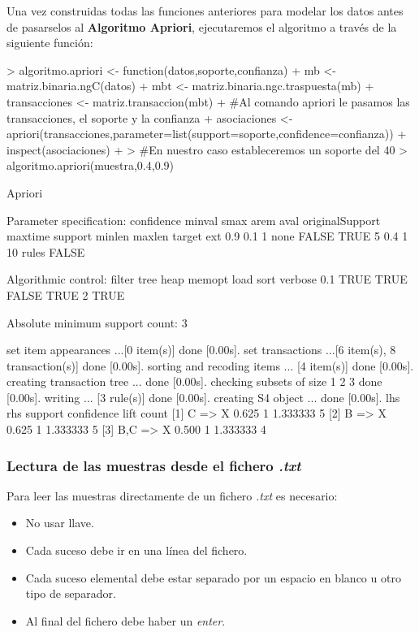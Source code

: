 \documentclass [a4paper] {article}
\begin{document}
Una vez construidas todas las funciones anteriores para modelar los datos antes de pasarselos al \textbf{Algoritmo Apriori},
ejecutaremos el algoritmo a través de la siguiente función:
\begin{Schunk}
\begin{Sinput}
> algoritmo.apriori <- function(datos,soporte,confianza){
+ 	mb <- matriz.binaria.ngC(datos)
+ 	mbt <- matriz.binaria.ngc.traspuesta(mb)
+     transacciones <- matriz.transaccion(mbt)
+ 	#Al comando apriori le pasamos las transacciones, el soporte y la confianza
+ 	asociaciones <- apriori(transacciones,parameter=list(support=soporte,confidence=confianza))	
+ 	inspect(asociaciones)
+ }
> #En nuestro caso estableceremos un soporte del 40% y una confianza del 90%
> algoritmo.apriori(muestra,0.4,0.9)
\end{Sinput}
\begin{Soutput}
Apriori

Parameter specification:
 confidence minval smax arem  aval originalSupport maxtime support minlen maxlen target   ext
        0.9    0.1    1 none FALSE            TRUE       5     0.4      1     10  rules FALSE

Algorithmic control:
 filter tree heap memopt load sort verbose
    0.1 TRUE TRUE  FALSE TRUE    2    TRUE

Absolute minimum support count: 3 

set item appearances ...[0 item(s)] done [0.00s].
set transactions ...[6 item(s), 8 transaction(s)] done [0.00s].
sorting and recoding items ... [4 item(s)] done [0.00s].
creating transaction tree ... done [0.00s].
checking subsets of size 1 2 3 done [0.00s].
writing ... [3 rule(s)] done [0.00s].
creating S4 object  ... done [0.00s].
    lhs      rhs support confidence lift     count
[1] {C}   => {X} 0.625   1          1.333333 5    
[2] {B}   => {X} 0.625   1          1.333333 5    
[3] {B,C} => {X} 0.500   1          1.333333 4    
\end{Soutput}
\end{Schunk}

\subsubsection{Lectura de las muestras desde el fichero \textit{.txt}}
Para leer las muestras directamente de un fichero \textit{.txt} es necesario:
\begin{itemize}
	\item No usar llave.
	\item Cada suceso debe ir en una línea del fichero.
	\item Cada suceso elemental debe estar separado por un espacio en blanco u otro tipo de separador.
	\item Al final del fichero debe haber un \textit{enter}.
\end{itemize}
\end{document}
